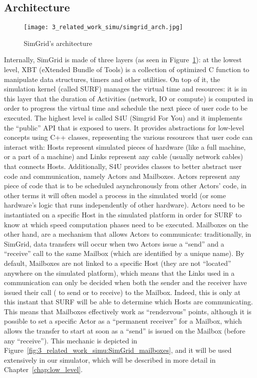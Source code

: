\subsection{Architecture}

\begin{figure}[!ht]
    \centering
    \texttt{[image: 3\_related\_work\_simu/simgrid\_arch.jpg]}
    \caption{SimGrid's architecture}
    \label{fig:3_related_work_simu:SimGrid_arch}
\end{figure}

Internally, SimGrid is made of three layers (as seen in
Figure~\ref{fig:3_related_work_simu:SimGrid_arch}): at the lowest level, XBT
(eXtended Bundle of Tools) is a collection of optimized C function to manipulate
data structures, timers and other utilities. On top of it, the simulation kernel
(called SURF) manages the virtual time and resources: it is in this layer that
the duration of Activities (network, IO or compute) is computed in order to
progress the virtual time and schedule the next piece of user code to be
executed. The highest level is called S4U (Simgrid For You) and it implements
the ``public'' API that is exposed to users. It provides abstractions for
low-level concepts using C++ classes, representing the various resources that
user code can interact with: Hosts represent simulated pieces of hardware (like
a full machine, or a part of a machine) and Links represent any cable (usually
network cables) that connects Hosts. Additionally, S4U provides classes to
better abstract user code and communication, namely Actors and Mailboxes. Actors
represent any piece of code that is to be scheduled asynchronously from other
Actors' code, in other terms it will often model a process in the simulated
world (or some hardware's logic that runs independently of other hardware).
Actors need to be instantiated on a specific Host in the simulated platform in
order for SURF to know at which speed computation phases need to be executed.
Mailboxes on the other hand, are a mechanism that allows Actors to communicate:
traditionally, in SimGrid, data transfers will occur when two Actors issue a
``send'' and a ``receive'' call to the same Mailbox (which are identified by a
unique name). By default, Mailboxes are not linked to a specific Host (they are
not ``located'' anywhere on the simulated platform), which means that the Links
used in a communication can only be decided when both the sender and the
receiver have issued their call ( to send or  to
receive) to the Mailbox. Indeed, this is only at this instant that SURF will be
able to determine which Hosts are communicating. This means that Mailboxes
effectively work as ``rendezvous'' points, although it is possible to set a
specific Actor as a ``permanent receiver'' for a Mailbox, which allows the
transfer to start at soon as a ``send'' is issued on the Mailbox (before any
``receive''). This mechanic is depicted in
Figure~\ref{fig:3_related_work_simu:SimGrid_mailboxes}, and it will be used
extensively in our simulator, which will be described in more detail in
Chapter~\ref{chap:low_level}.

